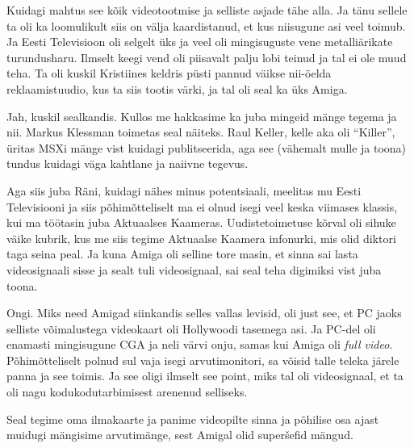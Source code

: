 Kuidagi mahtus see kõik videotootmise ja selliste asjade tähe alla. Ja tänu sellele ta oli ka loomulikult siis on välja kaardistanud, et kus niisugune asi veel toimub. Ja Eesti Televisioon oli selgelt üks ja veel oli mingisuguste vene metalliärikate turundusharu. Ilmselt keegi vend oli piisavalt palju lobi teinud ja tal ei ole muud teha. Ta oli kuskil Kristiines  keldris püsti pannud väikse nii-öelda reklaamistuudio, kus ta siis tootis värki, ja tal oli seal ka üks Amiga. 


Jah, kuskil sealkandis. Kullos me hakkasime ka juba mingeid mänge tegema ja nii. Markus Klessman toimetas seal näiteks. Raul Keller, kelle aka oli \enquote{Killer}, üritas MSXi mänge vist kuidagi publitseerida, aga see (vähemalt mulle ja toona) tundus kuidagi väga kahtlane ja naiivne tegevus.

Aga siis juba Räni, kuidagi nähes minus potentsiaali, meelitas mu Eesti Televisiooni ja siis põhimõtteliselt ma ei olnud isegi veel keska viimases klassis, kui ma töötasin juba Aktuaalses Kaameras. Uudistetoimetuse kõrval oli sihuke väike kubrik, kus me siis tegime Aktuaalse Kaamera infonurki, mis olid  diktori taga seina peal. Ja kuna Amiga oli selline tore masin, et  sinna sai lasta videosignaali sisse ja sealt tuli videosignaal, sai seal teha digimiksi vist juba toona. 


Ongi. Miks need Amigad siinkandis selles vallas levisid, oli just see, et PC jaoks selliste võimalustega videokaart oli Hollywoodi tasemega asi. Ja PC-del oli enamasti mingisugune CGA ja neli värvi onju, samas kui Amiga oli \emph{full video}. Põhimõtteliselt polnud sul vaja isegi arvutimonitori, sa võisid talle teleka järele panna ja see toimis. Ja see oligi ilmselt see point, miks tal oli videosignaal, et ta oli nagu kodukodutarbimisest arenenud selliseks. 

Seal tegime oma ilmakaarte ja panime videopilte sinna ja põhilise osa ajast muidugi mängisime arvutimänge, sest  Amigal olid superšefid mängud. 


